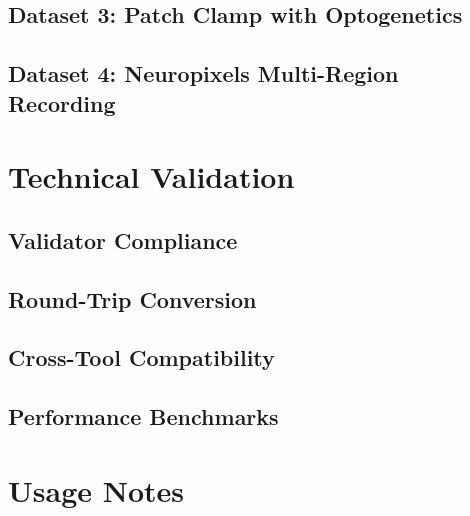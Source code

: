 \documentclass[fleqn,10pt]{wlscirep}
\begin{document}
\subsection*{Dataset 3: Patch Clamp with Optogenetics}

\subsection*{Dataset 4: Neuropixels Multi-Region Recording}

\section*{Technical Validation}



\subsection*{Validator Compliance}

\subsection*{Round-Trip Conversion}

\subsection*{Cross-Tool Compatibility}

\subsection*{Performance Benchmarks}

\section*{Usage Notes}

\end{document}
